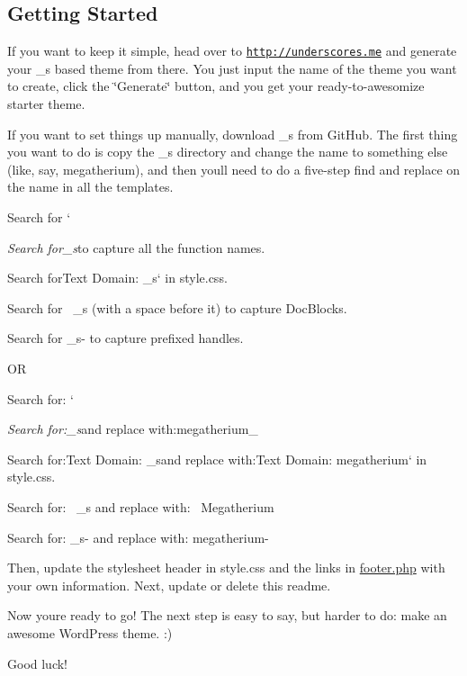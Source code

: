 \subsection*{Getting Started }

If you want to keep it simple, head over to \href{http://underscores.me}{\tt http\+://underscores.\+me} and generate your {\ttfamily \+\_\+s} based theme from there. You just input the name of the theme you want to create, click the \char`\"{}\+Generate\char`\"{} button, and you get your ready-\/to-\/awesomize starter theme.

If you want to set things up manually, download {\ttfamily \+\_\+s} from Git\+Hub. The first thing you want to do is copy the {\ttfamily \+\_\+s} directory and change the name to something else (like, say, {\ttfamily megatherium}), and then you\textquotesingle{}ll need to do a five-\/step find and replace on the name in all the templates.


\begin{DoxyEnumerate}
\item Search for `
\item {\itshape {\ttfamily Search for}\+\_\+s}{\ttfamily to capture all the function names.}
\item {\ttfamily Search for}Text Domain\+: \+\_\+s` in style.\+css.
\item Search for {\ttfamily ~\+\_\+s} (with a space before it) to capture Doc\+Blocks.
\item Search for {\ttfamily \+\_\+s-\/} to capture prefixed handles.
\end{DoxyEnumerate}

O\+R


\begin{DoxyItemize}
\item Search for\+: `
\item {\itshape {\ttfamily Search for\+:}\+\_\+s}{\ttfamily and replace with\+:}megatherium\+\_\+{\ttfamily }
\item {\ttfamily Search for\+:}Text Domain\+: \+\_\+s{\ttfamily and replace with\+:}Text Domain\+: megatherium` in style.\+css.
\item Search for\+: {\ttfamily ~\+\_\+s} and replace with\+: {\ttfamily ~Megatherium}
\item Search for\+: {\ttfamily \+\_\+s-\/} and replace with\+: {\ttfamily megatherium-\/}
\end{DoxyItemize}

Then, update the stylesheet header in {\ttfamily style.\+css} and the links in {\ttfamily \hyperlink{footer_8php}{footer.\+php}} with your own information. Next, update or delete this readme.

Now you\textquotesingle{}re ready to go! The next step is easy to say, but harder to do\+: make an awesome Word\+Press theme. \+:)

Good luck! 